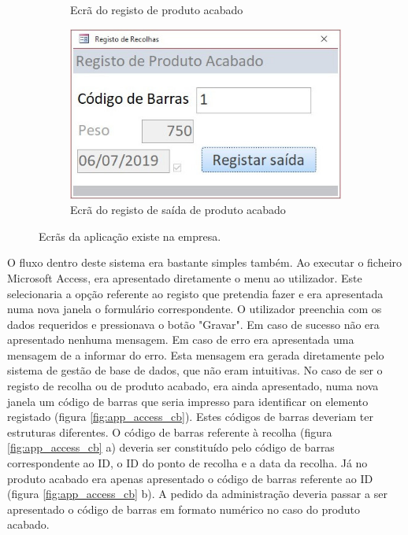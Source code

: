 \begin{figure}[h!]
\begin{subfigure}[c]{0.3\linewidth}
		\caption{Ecrã do registo de produto acabado}
	\end{subfigure}
	\begin{subfigure}[c]{0.3\linewidth}
		\includegraphics[width=\linewidth]{figuras/AppAccess/5-SaidaProdutoAcabado.jpg}
		\caption{Ecrã do registo de saída de produto acabado}
	\end{subfigure}
	
	\caption{Ecrãs da aplicação existe na empresa.}
	\label{fig:app_access}
\end{figure}

O fluxo dentro deste sistema era bastante simples também. Ao executar o ficheiro Microsoft Access, era apresentado diretamente o menu ao utilizador. Este selecionaria a opção referente ao registo que pretendia fazer e era apresentada numa nova janela o formulário correspondente. O utilizador preenchia com os dados requeridos e pressionava o botão "Gravar". Em caso de sucesso não era apresentado nenhuma mensagem. Em caso de erro era apresentada uma mensagem de a informar do erro. Esta mensagem era gerada diretamente pelo sistema de gestão de base de dados, que não eram intuitivas. No caso de ser o registo de recolha ou de produto acabado, era ainda apresentado, numa nova janela um código de barras que seria impresso para identificar on elemento registado (figura \ref{fig:app_access_cb}). Estes códigos de barras deveriam ter estruturas diferentes. O código de barras referente à recolha (figura \ref{fig:app_access_cb} a) deveria ser constituído pelo código de barras correspondente ao ID, o ID do ponto de recolha e a data da recolha. Já no produto acabado era apenas apresentado o código de barras referente ao ID (figura \ref{fig:app_access_cb} b). A pedido da administração deveria passar a ser apresentado o código de barras em formato numérico no caso do produto acabado.

